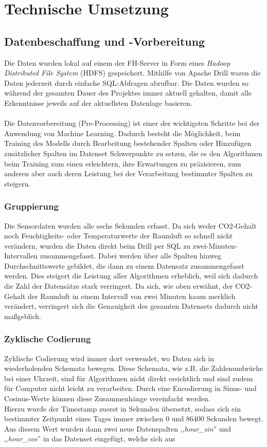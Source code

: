 \newpage
\chapter{Technische Umsetzung}

\section{Datenbeschaffung und -Vorbereitung}
Die Daten wurden lokal auf einem der FH-Server in Form eines \textit{Hadoop Distributed File System} (HDFS) 
gespeichert. Mithilfe von Apache Drill waren die Daten jederzeit durch einfache SQL-Abfragen abrufbar. 
Die Daten wurden so während der gesamten Dauer des Projektes immer aktuell gehalten, damit alle Erkenntnisse 
jeweils auf der aktuellsten Datenlage basieren.
\\\\
Die Datenvorbereitung (Pre-Processing) ist einer der wichtigsten Schritte bei der Anwendung von Machine 
Learning. Dadurch besteht die Möglichkeit, beim Training des Modells durch Bearbeitung bestehender Spalten
oder Hinzufügen zusätzlicher Spalten im Datenset Schwerpunkte zu setzen, die es den Algorithmen beim Training
zum einen erleichtern, ihre Erwartungen zu präzisieren, zum anderen aber auch deren Leistung bei der Verarbeitung
bestimmter Spalten zu steigern.
\subsection{Gruppierung}
Die Sensordaten wurden alle sechs Sekunden erfasst. Da sich weder CO2-Gehalt noch Feuchtigkeits- oder 
Temperaturwerte der Raumluft so schnell nicht verändern, wurden die Daten direkt beim Drill per SQL zu 
zwei-Minuten-Intervallen zusammengefasst. Dabei werden über alle Spalten hinweg Durchschnittswerte gebildet, 
die dann zu einem Datensatz zusammengefasst werden. 
Dies steigert die Leistung aller Algorithmen erheblich, weil sich dadurch die Zahl der 
Datensätze stark verringert. Da sich, wie oben erwähnt, der CO2-Gehalt der Raumluft in einem 
Intervall von zwei Minuten kaum merklich verändert, verringert sich die Genauigkeit des gesamten Datensets
dadurch nicht maßgeblich.
\subsection{Zyklische Codierung}
Zyklische Codierung wird immer dort verwendet, wo Daten sich in wiederholenden Schemata bewegen. Diese 
Schemata, wie z.B. die Zahlenumbrüche bei einer Uhrzeit, sind für Algorithmen nicht direkt ersichtlich und 
sind zudem für Computer nicht leicht zu verarbeiten. Durch eine Encodierung in 
Sinus- und Cosinus-Werte können diese Zusammenhänge vereinfacht werden.\\
Hierzu wurde der Timestamp zuerst in Sekunden übersetzt, sodass sich ein bestimmter Zeitpunkt eines Tages 
immer zwischen 0 und 86400 Sekunden bewegt.
Aus diesem Wert wurden dann zwei neue Datenspalten ,,\textit{hour\_sin}'' und ,,\textit{hour\_cos}'' 
in das Datenset eingefügt, welche sich aus 

